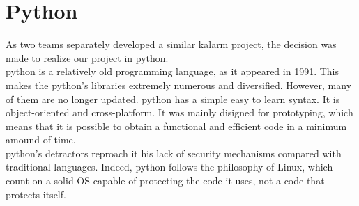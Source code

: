 \section{Python}
As two teams separately developed a similar \gls{kalarm} project, the decision was made to realize our project in python.\\
\gls{python} is a relatively old programming language, as it appeared in 1991. This makes the \gls{python}'s libraries extremely numerous and diversified. However, many of them are no longer updated. \gls{python} has a simple easy to learn syntax. It is object-oriented and cross-platform. It was mainly disigned for prototyping, which means that it is possible to obtain a functional and efficient code in a minimum amound of time.\\
\gls{python}'s detractors reproach it his lack of security mechanisms compared with traditional languages. Indeed, \gls{python} follows the philosophy of Linux, which count on a solid OS capable of protecting the code it uses, not a code that protects itself.